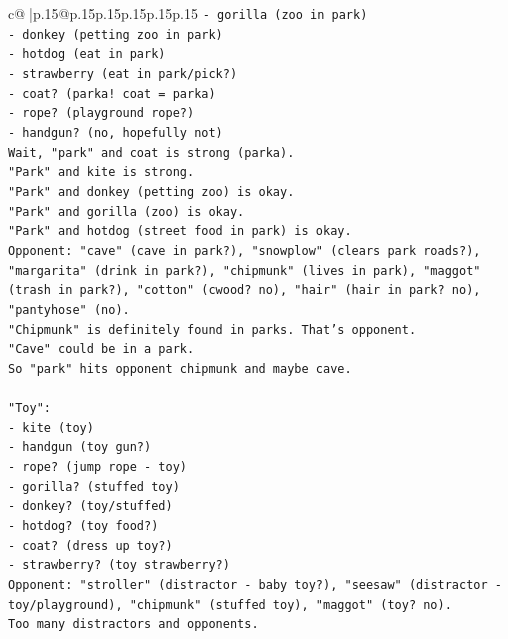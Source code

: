 \documentclass{article}
\begin{document}
{\begin{supertabular}{c@{$\;$}|p{.15\linewidth}@{}p{.15\linewidth}p{.15\linewidth}p{.15\linewidth}p{.15\linewidth}p{.15\linewidth}}
{{{\texttt{{-} gorilla (zoo in park)} \\
\texttt{{-} donkey (petting zoo in park)} \\
\texttt{{-} hotdog (eat in park)} \\
\texttt{{-} strawberry (eat in park/pick?)} \\
\texttt{{-} coat? (parka! coat = parka)} \\
\texttt{{-} rope? (playground rope?)} \\
\texttt{{-} handgun? (no, hopefully not)} \\
\texttt{Wait, "park" and coat is strong (parka).} \\
\texttt{"Park" and kite is strong.} \\
\texttt{"Park" and donkey (petting zoo) is okay.} \\
\texttt{"Park" and gorilla (zoo) is okay.} \\
\texttt{"Park" and hotdog (street food in park) is okay.} \\
\texttt{Opponent: "cave" (cave in park?), "snowplow" (clears park roads?), "margarita" (drink in park?), "chipmunk" (lives in park), "maggot" (trash in park?), "cotton" (cwood? no), "hair" (hair in park? no), "pantyhose" (no).} \\
\texttt{"Chipmunk" is definitely found in parks. That's opponent.} \\
\texttt{"Cave" could be in a park.} \\
\texttt{So "park" hits opponent chipmunk and maybe cave.} \\
\\ 
\texttt{"Toy":} \\
\texttt{{-} kite (toy)} \\
\texttt{{-} handgun (toy gun?)} \\
\texttt{{-} rope? (jump rope {-} toy)} \\
\texttt{{-} gorilla? (stuffed toy)} \\
\texttt{{-} donkey? (toy/stuffed)} \\
\texttt{{-} hotdog? (toy food?)} \\
\texttt{{-} coat? (dress up toy?)} \\
\texttt{{-} strawberry? (toy strawberry?)} \\
\texttt{Opponent: "stroller" (distractor {-} baby toy?), "seesaw" (distractor {-} toy/playground), "chipmunk" (stuffed toy), "maggot" (toy? no).} \\
\texttt{Too many distractors and opponents.} \\
\\ 
}}}
\end{supertabular}}
\end{document}
